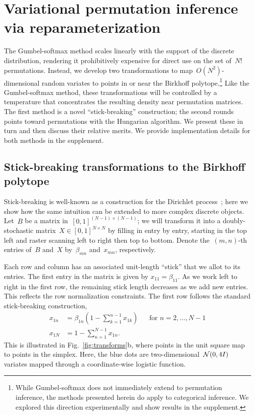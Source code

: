 \documentclass[twoside]{article}
\begin{document}
\section{Variational permutation inference via reparameterization}
\label{sec:permutation}
The Gumbel-softmax method scales linearly with the support of the
discrete distribution, rendering it prohibitively expensive for direct
use on the set of~$N!$ permutations.  Instead, we develop two
transformations to map~$O(N^2)$-dimensional random variates to points
in or near the Birkhoff polytope.\footnote{While Gumbel-softmax does
  not immediately extend to permutation inference, the methods
  presented herein do apply to categorical inference.  We
  explored this direction experimentally and show results in the
  supplement.}  Like the Gumbel-softmax method, these transformations
will be controlled by a temperature that concentrates the resulting
density near permutation matrices.  The first method is a novel
``stick-breaking'' construction; the second rounds points toward
permutations with the Hungarian algorithm.  We present these in turn
and then discuss their relative merits. We provide 
implementation details for both methods in the supplement.

\subsection{Stick-breaking transformations to the Birkhoff polytope}
\label{sub:stickbreaking}

Stick-breaking is well-known as a construction for the Dirichlet
process~\citep{sethuraman1994constructive}; here we show how the
same intuition can be extended to more complex discrete objects. 
Let~$B$ be a matrix in~${[0,1]^{(N-1) \times (N-1)}}$; we will
transform it into a doubly-stochastic
matrix~${X \in [0,1]^{N \times N}}$ by filling in entry by entry, starting
in the top left and raster scanning left to right then top to
bottom. Denote the~$(m,n)$-th entries of~$B$ and~$X$ by~$\beta_{mn}$
and~${x}_{mn}$, respectively.

Each row and column has an associated unit-length ``stick'' that we
allot to its entries.  The first entry in the matrix is given by
$x_{11} = \beta_{11}$.  As we work left to right in the first row, the
remaining stick length decreases as we add new entries. This reflects
the row normalization constraints.  The first row follows the standard
stick-breaking construction,
\begin{align*}
  x_{1n} &= \beta_{1n} \left(1 - \sum_{k=1}^{n-1} x_{1k} \right)  & &  \text{for } n=2, \ldots, N-1\\
  x_{1N} &= 1 - \sum_{n=1}^{N-1} x_{1n}.
\end{align*}
This is illustrated in Fig.~\ref{fig:transforms}b, where points in the
unit square map to points in the simplex. Here, the blue dots are
two-dimensional~$\mathcal{N}(0, 4I)$ variates mapped through a
coordinate-wise logistic function.
\end{document}
